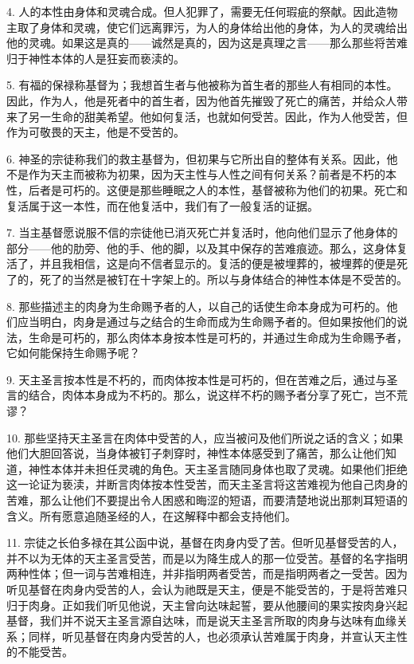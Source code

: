 4. 人的本性由身体和灵魂合成。但人犯罪了，需要无任何瑕疵的祭献。因此造物主取了身体和灵魂，使它们远离罪污，为人的身体给出他的身体，为人的灵魂给出他的灵魂。如果这是真的——诚然是真的，因为这是真理之言——那么那些将苦难归于神性本体的人是狂妄而亵渎的。\par

5. 有福的保禄称基督为；我想首生者与他被称为首生者的那些人有相同的本性。因此，作为人，他是死者中的首生者，因为他首先摧毁了死亡的痛苦，并给众人带来了另一生命的甜美希望。他如何复活，也就如何受苦。因此，作为人他受苦，但作为可敬畏的天主，他是不受苦的。\par

6. 神圣的宗徒称我们的救主基督为，但初果与它所出自的整体有关系。因此，他不是作为天主而被称为初果，因为天主性与人性之间有何关系？前者是不朽的本性，后者是可朽的。这便是那些睡眠之人的本性，基督被称为他们的初果。死亡和复活属于这一本性，而在他复活中，我们有了一般复活的证据。\par

7. 当主基督愿说服不信的宗徒他已消灭死亡并复活时，他向他们显示了他身体的部分——他的肋旁、他的手、他的脚，以及其中保存的苦难痕迹。那么，这身体复活了，并且我相信，这是向不信者显示的。复活的便是被埋葬的，被埋葬的便是死了的，死了的当然是被钉在十字架上的。所以与身体结合的神性本体是不受苦的。\par

8. 那些描述主的肉身为生命赐予者的人，以自己的话使生命本身成为可朽的。他们应当明白，肉身是通过与之结合的生命而成为生命赐予者的。但如果按他们的说法，生命是可朽的，那么肉体本身按本性是可朽的，并通过生命成为生命赐予者，它如何能保持生命赐予呢？\par

9. 天主圣言按本性是不朽的，而肉体按本性是可朽的，但在苦难之后，通过与圣言的结合，肉体本身成为不朽的。那么，说这样不朽的赐予者分享了死亡，岂不荒谬？\par

10. 那些坚持天主圣言在肉体中受苦的人，应当被问及他们所说之话的含义；如果他们大胆回答说，当身体被钉子刺穿时，神性本体感受到了痛苦，那么让他们知道，神性本体并未担任灵魂的角色。天主圣言随同身体也取了灵魂。如果他们拒绝这一论证为亵渎，并断言肉体按本性受苦，而天主圣言将这苦难视为他自己肉身的苦难，那么让他们不要提出令人困惑和晦涩的短语，而要清楚地说出那刺耳短语的含义。所有愿意追随圣经的人，在这解释中都会支持他们。\par

11. 宗徒之长伯多禄在其公函中说，基督在肉身内受了苦。但听见基督受苦的人，并不以为无体的天主圣言受苦，而是以为降生成人的那一位受苦。基督的名字指明两种性体；但一词与苦难相连，并非指明两者受苦，而是指明两者之一受苦。因为听见基督在肉身内受苦的人，会认为祂既是天主，便是不能受苦的，于是将苦难只归于肉身。正如我们听见他说，天主曾向达味起誓，要从他腰间的果实按肉身兴起基督，我们并不说天主圣言源自达味，而是说天主圣言所取的肉身与达味有血缘关系；同样，听见基督在肉身内受苦的人，也必须承认苦难属于肉身，并宣认天主性的不能受苦。\par

